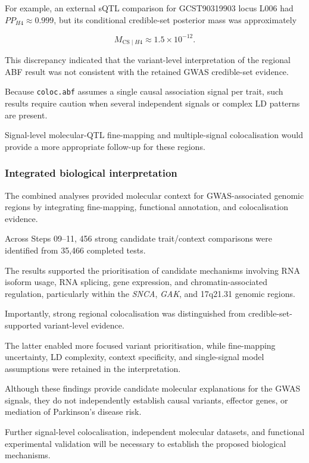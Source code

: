 \documentclass[11pt,a4paper]{article}
\begin{document}
For example, an external sQTL comparison
for GCST90319903 locus L006 had
$PP_{H4}\approx0.999$, but its conditional
credible-set posterior mass was approximately

\begin{equation}
M_{\mathrm{CS}\mid H4}
\approx 1.5 \times 10^{-12}.
\end{equation}

This discrepancy indicated that the
variant-level interpretation of the regional
ABF result was not consistent with the
retained GWAS credible-set evidence.

Because \texttt{coloc.abf} assumes
a single causal association signal per trait,
such results require caution when several
independent signals or complex LD patterns
are present.

Signal-level molecular-QTL fine-mapping
and multiple-signal colocalisation would
provide a more appropriate follow-up
for these regions.


\subsubsection{Integrated biological interpretation}
\label{subsec:integrated_interpretation}

The combined analyses provided molecular
context for GWAS-associated genomic regions
by integrating fine-mapping, functional
annotation, and colocalisation evidence.

Across Steps 09--11, 456 strong
candidate trait/context comparisons were
identified from 35,466 completed tests.

The results supported the prioritisation of
candidate mechanisms involving RNA isoform
usage, RNA splicing, gene expression,
and chromatin-associated regulation,
particularly within the \textit{SNCA},
\textit{GAK}, and 17q21.31 genomic regions.

Importantly, strong regional colocalisation
was distinguished from credible-set-supported
variant-level evidence.

The latter enabled more focused
variant prioritisation, while fine-mapping
uncertainty, LD complexity, context specificity,
and single-signal model assumptions were
retained in the interpretation.

Although these findings provide candidate
molecular explanations for the GWAS signals,
they do not independently establish causal
variants, effector genes, or mediation
of Parkinson's disease risk.

Further signal-level colocalisation,
independent molecular datasets, and
functional experimental validation will be
necessary to establish the proposed
biological mechanisms.
\end{document}
